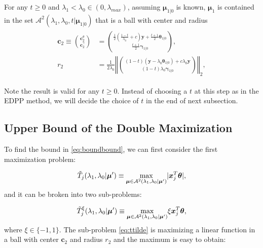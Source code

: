 \begin{theorem}
    \label{thm:1.2}
    For any $t\geq0$ and $\lambda_1<\lambda_{0}\in (0,\lambda_{max})$, assuming $\boldsymbol\mu_{1|0}$ is known, $\boldsymbol\mu_1$ is contained in the set $\mathcal{A}^2(\lambda_1,\lambda_0,t|\boldsymbol\mu_{1|0})$ that is a ball with center and radius
    \begin{gather}
        \begin{aligned}
            \boldsymbol c_2\equiv\binom{\boldsymbol c_2^\theta}{\boldsymbol c_2^\gamma}&=\binom{\frac{1}{2}(\frac{1-t}{\lambda_0}+c)\boldsymbol y+\frac{t+1}{2}\boldsymbol\theta_{1|0}}{\frac{t+1}{2}\boldsymbol\gamma_{1|0}},\\
            r_2&=\frac{1}{2\lambda_0}\left\Vert\binom{(1-t)(\boldsymbol y-\lambda_0\boldsymbol\theta_{1|0})+c\lambda_0\boldsymbol y}{(1-t)\lambda_0\boldsymbol\gamma_{1|0}}\right\Vert_2,
        \end{aligned}
    \end{gather}
\end{theorem}
Note the result is valid for any $t\geq 0$. Instead of choosing a $t$ at this step as in the EDPP method, we will decide the choice of $t$ in the end of next subsection.

\subsection{Upper Bound of the Double Maximization}


To find the bound in \eqref{eq:boundbound}, we can first consider the first maximization problem:

\begin{equation}
    \Tilde{T}_j(\lambda_1,\lambda_0|\boldsymbol\mu')\equiv\underset{\boldsymbol\mu\in\mathcal{A}^2(\lambda_1,\lambda_0|\boldsymbol\mu')}{\mathrm{max}}|\boldsymbol x_j^T\boldsymbol\theta|,
\end{equation}
and it can be broken into two sub-problems:

\begin{equation}
    \label{eq:ttilde}
    \Tilde{T}^\xi_j(\lambda_1,\lambda_0|\boldsymbol\mu')\equiv\underset{\boldsymbol\mu\in\mathcal{A}^2(\lambda_1,\lambda_0|\boldsymbol\mu')}{\mathrm{max}}\xi \boldsymbol x_j^T\boldsymbol\theta,
\end{equation}
where $\xi\in\{-1,1\}$. The sub-problem \eqref{eq:ttilde} is maximizing a linear function in a ball with center $\boldsymbol c_2$ and radius $r_2$ and the maximum is easy to obtain:

